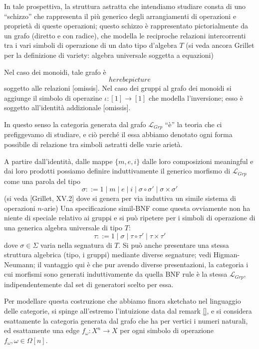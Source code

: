 \documentclass{amsart}
\begin{document}
In tale prospettiva, la struttura astratta che intendiamo studiare consta di uno ``schizzo'' \cite{ehresmann,lair} che rappresenta il più generico degli arrangiamenti di operazioni e proprietà di queste operazioni; questo schizzo è rappresentato pictorialmente da un grafo (diretto e con radice), che modella le reciproche relazioni intercorrenti tra i vari simboli di operazione di un dato tipo d'algebra $T$ (si veda ancora Grillet per la definizione di variety: algebra universale soggetta a equazioni)

Nel caso dei monoidi, tale grafo è
\[here be picture\]
soggetto alle relazioni [omissis]. Nel caso dei gruppi al grafo dei monoidi si aggiunge il simbolo di operazine $\iota : [1] \to [1]$ che modella l'inversione; esso è soggetto all'identità addizionale [omissis].

In questo senso la categoria generata dal grafo $\mathcal{L}_{Grp}$ ``è'' la teoria che ci prefiggevamo di studiare, e ciò perché il essa abbiamo denotato ogni forma possibile di relazione tra simboli astratti delle varie arietà.

A partire dall'identità, dalle mappe $\{m,e,i\}$ dalle loro composizioni meaningful e dai loro prodotti possiamo definire induttivamente il generico morfismo di $\mathcal{L}_{Grp}$ come una parola del tipo
\[\sigma ::= 1 \mid m \mid e \mid i \mid \sigma \circ \sigma' \mid \sigma\times \sigma'\]
(si veda [Grillet, XV.2] dove si genera per via induttiva un simile sistema di operazioni $n$-arie) Una specificazione simil-BNF come questa ovviamente non ha niente di speciale relativo ai gruppi e si può ripetere per i simboli di operazione di una generica algebra universale di tipo $T$:
\[\tau ::= 1 \mid \sigma \mid \tau \circ \tau' \mid \tau\times \tau'\]
dove $\sigma\in\Sigma$ varia nella segnatura di $T$. Si può anche presentare una stessa struttura algebrica (tipo, i gruppi) mediante diverse segnature; vedi Higman-Neumann; il vantaggio qui è che pur avendo diverse presentazioni, la categoria i cui morfismi sono generati induttivamente da quella BNF rule è la stessa $\mathcal{L}_{Grp}$, indipendentemente dal set di generatori scelto per essa.

Per modellare questa costruzione che abbiamo finora sketchato nel linguaggio delle categorie, si spinge all'estremo l'intuizione data dal remark \ref{}, e si considera esattamente la categoria generata dal grafo che ha per vertici i numeri naturali, ed esattamente una edge $f_\omega : X^n \to X$ per ogni simbolo di operazione $f_\omega, \omega \in\Omega[n]$.
\end{document}

